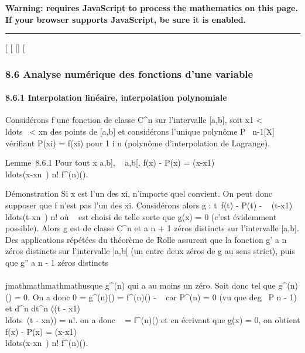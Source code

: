 \textbf{Warning: 
requires JavaScript to process the mathematics on this page.\\ If your
browser supports JavaScript, be sure it is enabled.}

\begin{center}\rule{3in}{0.4pt}\end{center}

{[}
{[}
{[}{]}
{[}

\subsubsection{8.6 Analyse numérique des fonctions d'une variable}

\paragraph{8.6.1 Interpolation linéaire, interpolation polynomiale}

Considérons f une fonction de classe C^n sur l'intervalle
{[}a,b{]}, soit x1 \textless{}
\\ldots~ \textless{}
xn des points de {[}a,b{]} et considérons l'unique polynôme P
\in {}~n-1{[}X{]} vérifiant P(xi) = f(xi) pour
1 \leq i \leq n (polynôme d'interpolation de Lagrange).

Lemme~8.6.1 Pour tout x \in {[}a,b{]}, \exists~\zeta
\in{]}a,b{[}, f(x) - P(x) =
(x-x1)\\ldots(x-xn~)
\over n! f^(n)(\zeta).

Démonstration Si x est l'un des xi, n'importe quel \zeta convient.
On peut donc supposer que f n'est pas l'un des xi. Considérons
alors g : t\mapsto~f(t) - P(t) - \lambda~
(t-x1)\\ldots(t-xn~)
\over n! où \lambda~ est choisi de telle sorte que g(x) = 0
(c'est évidemment possible). Alors g est de classe C^n et a n
+ 1 zéros distincts sur l'intervalle {[}a,b{]}. Des applications
répétées du théorème de Rolle assurent que la fonction g' a n zéros
distincts sur l'intervalle {]}a,b{[} (un entre deux zéros de g au sens
strict), puis que g'' a n - 1 zéros distincts \\\\jmathmathmathmathusque g^(n)
qui a au moins un zéro. Soit donc \zeta tel que g^(n)(\zeta) = 0. On
a donc 0 = g^(n)(\zeta) = f^(n)(\zeta) - \lambda~ car
P^(n) = 0 (vu que deg~ P \leq n - 1) et
 d^n \over dt^n ((t -
x1)\\ldots~(t
- xn)) = n!. on a donc \lambda~ = f^(n)(\zeta) et en écrivant
que g(x) = 0, on obtient f(x) - P(x) =
(x-x1)\\ldots(x-xn~)
\over n! f^(n)(\zeta).

